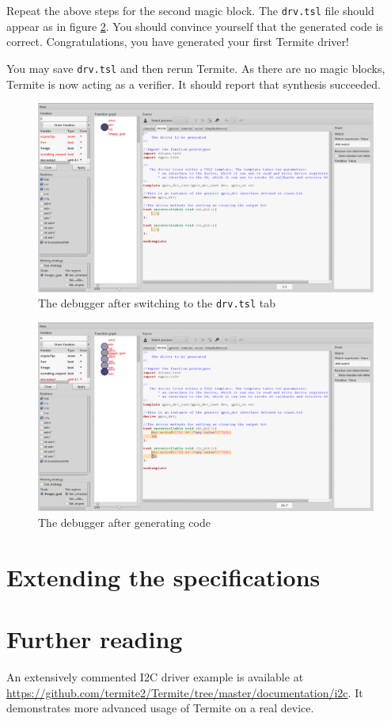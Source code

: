 \documentclass{article}
\newcommand{\code}[1]{\texttt{#1}}
\begin{document}
Repeat the above steps for the second magic block. The \code{drv.tsl} file should appear as in figure \ref{fig:screenshot_after}. You should convince yourself that the generated code is correct. Congratulations, you have generated your first Termite driver!

You may save \code{drv.tsl} and then rerun Termite. As there are no magic blocks, Termite is now acting as a verifier. It should report that synthesis succeeded. 

\begin{figure}
    \center
    \includegraphics[width=\linewidth]{figs/debugger1.png}
    \caption{The debugger after switching to the \code{drv.tsl} tab}
    \label{fig:screenshot_before}
\end{figure}

\begin{figure}
    \center
    \includegraphics[width=\linewidth]{figs/debugger2.png}
    \caption{The debugger after generating code}
    \label{fig:screenshot_after}
\end{figure}

\section{Extending the specifications}
\label{sec:extending}

\section{Further reading}
An extensively commented I2C driver example is available at \url{https://github.com/termite2/Termite/tree/master/documentation/i2c}. It demonstrates more advanced usage of Termite on a real device. 


 
\end{document}
